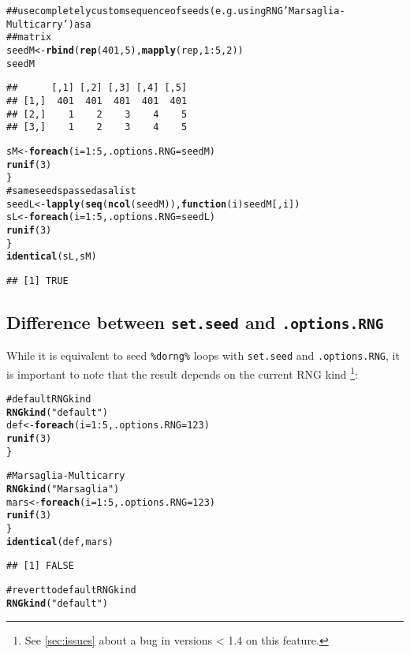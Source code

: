 \documentclass[a4paper,12pt]{article}\usepackage{graphicx, color}
\makeatletter
\newcommand{\hlfunctioncall}[1]{\textcolor[rgb]{0.501960784313725,0,0.329411764705882}{\textbf{#1}}}%
\newcommand{\hlstring}[1]{\textcolor[rgb]{0.6,0.6,1}{#1}}%
\newcommand{\hlcomment}[1]{\textcolor[rgb]{0.180392156862745,0.6,0.341176470588235}{#1}}%
\newenvironment{kframe}{%
 \def\at@end@of@kframe{}%
 \ifinner\ifhmode%
  \def\at@end@of@kframe{\end{minipage}}%
  \begin{minipage}{\columnwidth}%
 \fi\fi%
 \def\FrameCommand##1{\hskip\@totalleftmargin \hskip-\fboxsep
 \colorbox{shadecolor}{##1}\hskip-\fboxsep
     \hskip-\linewidth \hskip-\@totalleftmargin \hskip\columnwidth}%
 \MakeFramed {\advance\hsize-\width
   \@totalleftmargin\z@ \linewidth\hsize
   \@setminipage}}%
 {\par\unskip\endMakeFramed%
 \at@end@of@kframe}
\newenvironment{knitrout}{}{} %
\renewenvironment{knitrout}{\begin{footnotesize}}{\end{footnotesize}}
\let\code=\texttt
\newcommand{\dorng}{\code{\%dorng\%}\xspace}
\makeatother
\begin{document}
\begin{description}
\begin{knitrout}
\begin{kframe}
\begin{alltt}
\hlcomment{## use completely custom sequence of seeds (e.g. using RNG 'Marsaglia-Multicarry') as a}
\hlcomment{## matrix}
seedM <- \hlfunctioncall{rbind}(\hlfunctioncall{rep}(401, 5), \hlfunctioncall{mapply}(rep, 1:5, 2))
seedM
\end{alltt}
\begin{verbatim}
##      [,1] [,2] [,3] [,4] [,5]
## [1,]  401  401  401  401  401
## [2,]    1    2    3    4    5
## [3,]    1    2    3    4    5
\end{verbatim}
\begin{alltt}
sM <- \hlfunctioncall{foreach}(i = 1:5, .options.RNG = seedM) %dorng% \{
    \hlfunctioncall{runif}(3)
\}
\hlcomment{# same seeds passed as a list}
seedL <- \hlfunctioncall{lapply}(\hlfunctioncall{seq}(\hlfunctioncall{ncol}(seedM)), \hlfunctioncall{function}(i) seedM[, i])
sL <- \hlfunctioncall{foreach}(i = 1:5, .options.RNG = seedL) %dorng% \{
    \hlfunctioncall{runif}(3)
\}
\hlfunctioncall{identical}(sL, sM)
\end{alltt}
\begin{verbatim}
## [1] TRUE
\end{verbatim}
\end{kframe}
\end{knitrout}

\end{description}

\subsection{Difference between \texttt{set.seed} and \texttt{.options.RNG}}
\label{sec:set_seed}

While it is equivalent to seed \dorng loops with \code{set.seed} and \code{.options.RNG},
it is important to note that the result depends on the current RNG kind
\footnote{See \cref{sec:issues} about a bug in versions < 1.4 on this feature.}:

\begin{knitrout}
\color{fgcolor}\begin{kframe}
\begin{alltt}
\hlcomment{# default RNG kind}
\hlfunctioncall{RNGkind}(\hlstring{"default"})
def <- \hlfunctioncall{foreach}(i = 1:5, .options.RNG = 123) %dorng% \{
    \hlfunctioncall{runif}(3)
\}

\hlcomment{# Marsaglia-Multicarry}
\hlfunctioncall{RNGkind}(\hlstring{"Marsaglia"})
mars <- \hlfunctioncall{foreach}(i = 1:5, .options.RNG = 123) %dorng% \{
    \hlfunctioncall{runif}(3)
\}
\hlfunctioncall{identical}(def, mars)
\end{alltt}
\begin{verbatim}
## [1] FALSE
\end{verbatim}
\begin{alltt}

\hlcomment{# revert to default RNG kind}
\hlfunctioncall{RNGkind}(\hlstring{"default"})
\end{alltt}
\end{kframe}
\end{knitrout}
\end{document}
